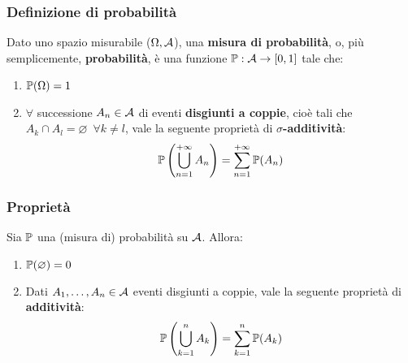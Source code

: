 \subsubsection{Definizione di probabilità}
\begin{defn}
  Dato uno spazio misurabile ($\Omega, \mathcal A$), una \textbf{misura di probabilità}, o, più semplicemente, \textbf{probabilità},
  è una funzione $\mathbb P:\mathcal A \to [0,1]$ tale che:
  \begin{enumerate}
    \item $\mathbb P(\Omega) = 1$
    \item $\forall$ successione $A_n \in \mathcal A$ di eventi \textbf{disgiunti a coppie}, cioè tali che $A_k \cap A_l=\varnothing \enspace \forall k \neq l$,  vale la seguente proprietà di \textbf{$\sigma$-additività}:
      $$\mathbb P\left(\bigcup\limits_{n=1}^{+\infty} A_n \right) = \sum\limits_{n=1}^{+\infty} \mathbb P(A_n)$$


  \end{enumerate}
\end{defn}



\subsubsection{Proprietà}

\begin{teob}[\JPTh{2.2}]
  Sia $\mathbb P$ una (misura di) probabilità su $\mathcal A$. Allora:
  \begin{enumerate}
    \item $\mathbb P(\varnothing) = 0$
    \item Dati $A_1, \dots, A_n \in \mathcal A$ eventi disgiunti a coppie, vale la seguente proprietà di \textbf{additività}:
      $$\mathbb P \left( \bigcup\limits_{k=1}^{n} A_k \right) = \sum\limits_{k=1}^{n} \mathbb P(A_k)$$
  \end{enumerate}
\end{teob}

